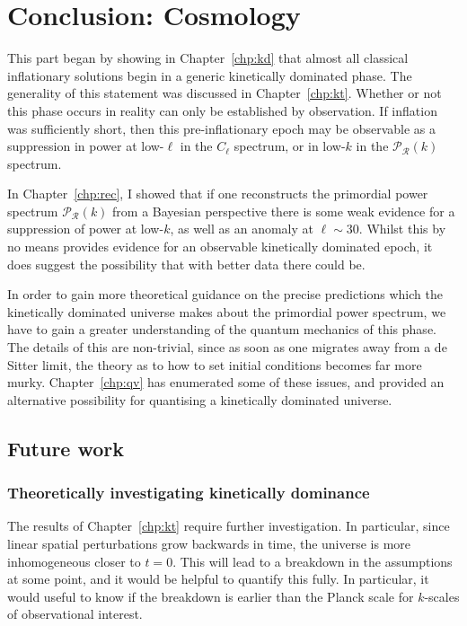 \chapter*[Conclusion: Cosmology]{Conclusion: Cosmology}

This part began by showing in Chapter~\ref{chp:kd} that almost all classical inflationary solutions begin in a generic kinetically dominated phase. The generality of this statement was discussed in Chapter~\ref{chp:kt}. 
Whether or not this phase occurs in reality can only be established by observation. If inflation was sufficiently short, then this pre-inflationary epoch may be observable as a suppression in power at low-\(\ell\) in the \(C_\ell\) spectrum, or in low-\(k\) in the \(\mathcal{P}_\mathcal{R}(k)\) spectrum. 

In Chapter~\ref{chp:rec}, I showed that if one reconstructs the primordial power spectrum \(\mathcal{P}_\mathcal{R}(k)\) from a Bayesian perspective there is some weak evidence for a suppression of power at low-\(k\), as well as an anomaly at \(\ell\sim30\). Whilst this by no means provides evidence for an observable kinetically dominated epoch, it does suggest the possibility that with better data there could be.

In order to gain more theoretical guidance on the precise predictions which the kinetically dominated universe makes about the primordial power spectrum, we have to gain a greater understanding of the quantum mechanics of this phase. The details of this are non-trivial, since as soon as one migrates away from a de Sitter limit, the theory as to how to set initial conditions becomes far more murky. Chapter~\ref{chp:qv} has enumerated some of these issues, and provided an alternative possibility for quantising a kinetically dominated universe.

\section*{Future work}
\subsection*{Theoretically investigating kinetically dominance}
The results of Chapter~\ref{chp:kt} require further investigation. In particular, since linear spatial perturbations grow backwards in time, the universe is more inhomogeneous closer to \(t=0\). This will lead to a breakdown in the assumptions at some point, and it would be helpful to quantify this fully. In particular, it would useful to know if the breakdown is earlier than the Planck scale for \(k\)-scales of observational interest.

